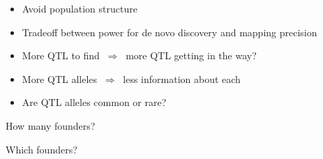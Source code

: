 \documentclass[12pt]{article}
\newcommand{\headsize}{\fontsize{35}{35} \selectfont}
\newcommand{\smallsize}{\fontsize{25}{30} \selectfont}
\newcommand{\smallersize}{\fontsize{20}{25} \selectfont}
\begin{document}
{\vspace{25mm}

\color{mywhite}
\smallersize

\hfill \begin{minipage}{10in}
\begin{itemize}
\itemsep24pt
\item Avoid population structure
\item Tradeoff between {\color{myblue} power for de novo discovery}
  and {\color{myblue} mapping precision}
\item More QTL to find $ \ \Rightarrow \ $ more QTL getting in the way?
\item More QTL alleles $ \ \Rightarrow \ $ less information about each
\item Are QTL alleles common or rare?
\end{itemize}
\end{minipage}



\newpage


\headsize \color{myyellow}
\hfill \begin{minipage}{5.75in}
\centering
How many founders?
\end{minipage}

\vspace{25mm}

\color{mywhite}
\smallsize



\newpage


\headsize \color{myyellow}
\hfill \begin{minipage}{5.75in}
\centering
Which founders?
\end{minipage}

}
\end{document}
